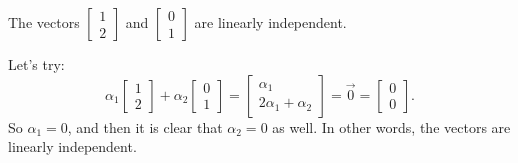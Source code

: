 \documentclass{ximera}
\begin{document}
\begin{example} The vectors
    $\left[ \begin{smallmatrix} 1 \\ 2 \end{smallmatrix} \right]$
    and
    $\left[ \begin{smallmatrix} 0 \\ 1 \end{smallmatrix} \right]$
    are linearly independent.
\end{example}

\begin{exampleSol}
    Let's try:
    \begin{equation*}
        \alpha_1 \begin{bmatrix} 1 \\ 2 \end{bmatrix}
        + \alpha_2 \begin{bmatrix} 0 \\ 1 \end{bmatrix} 
        = \begin{bmatrix} \alpha_1 \\ 2 \alpha_1 + \alpha_2 \end{bmatrix} 
        = \vec{0} = \begin{bmatrix} 0 \\ 0 \end{bmatrix} .
    \end{equation*}
    So $\alpha_1 = 0$, and then it is clear that $\alpha_2 = 0$ as well.  In other words, the vectors are linearly independent.
\end{exampleSol}
\end{document}
